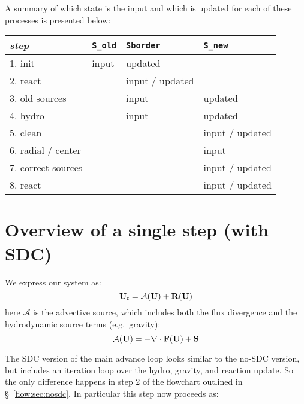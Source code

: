 A summary of which state is the input and which is updated for each of
these processes is presented below:
\begin{center}
\renewcommand{\arraystretch}{1.5}
\begin{tabular}{l|lll}
{\em step} & {\tt S\_old} & {\tt Sborder} & {\tt S\_new} \\
\hline
1. init    &   input      &   updated \\
2. react   &              &    input / updated \\
3. old sources &          &   input    & updated \\
4. hydro   &              & input      & updated \\
5. clean   &              &            & input / updated \\
6. radial / center  &     &            & input \\
7. correct sources &      &            & input / updated \\
8. react   &              &            & input / updated
\end{tabular}
\end{center}



\section{Overview of a single step (with SDC)}

We express our system as:
\begin{equation}
{\bf U}_t = \mathcal{A}({\bf U}) + {\bf R}({\bf U})
\end{equation}
here $\mathcal{A}$ is the advective source, which includes both the 
flux divergence and the hydrodynamic source terms (e.g.\ gravity):
\begin{equation}
\mathcal{A}({\bf U}) = -\nabla \cdot {\bf F}({\bf U}) + {\bf S}
\end{equation}

The SDC version of the main advance loop looks similar to the no-SDC
version, but includes an iteration loop over the hydro, gravity, and
reaction update.  So the only difference happens in step 2 of the
flowchart outlined in \S~\ref{flow:sec:nosdc}.  In particular this
step now proceeds as:

